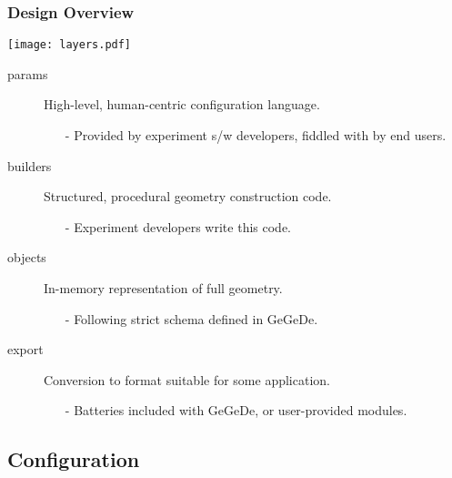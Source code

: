 \documentclass[10pt,xcolor=dvipsnames]{beamer}
\begin{document}
\begin{frame}
  \frametitle{Design Overview}

  \vspace{-5mm}
  \begin{center}
    \texttt{[image: layers.pdf]}
  \end{center}
  \vspace{-5mm}

  \begin{description}
  \item[params] High-level, human-centric configuration language.
    \begin{itemize}\scriptsize
    \item[-] Provided by experiment s/w developers, fiddled with by end users.
    \end{itemize}
  \item[builders] Structured, procedural geometry construction code.
    \begin{itemize}\scriptsize
    \item[-] Experiment developers write this code.
    \end{itemize}
  \item[objects] In-memory representation of full geometry.
    \begin{itemize}\scriptsize
    \item[-] Following strict schema defined in GeGeDe.
    \end{itemize}
  \item[export] Conversion to format suitable for some application.
    \begin{itemize}\scriptsize
    \item[-] Batteries included with GeGeDe, or user-provided modules.
    \end{itemize}
  \end{description}
\end{frame}

\subsection{Configuration}
\end{document}
